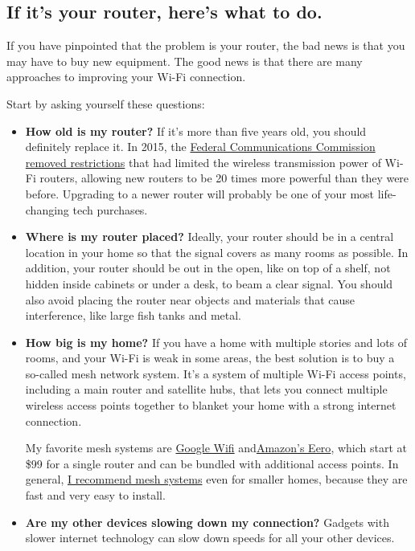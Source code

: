 \hypertarget{if-its-your-router-heres-what-to-do}{%
\subsection{If it's your router, here's what to
do.}\label{if-its-your-router-heres-what-to-do}}

If you have pinpointed that the problem is your router, the bad news is
that you may have to buy new equipment. The good news is that there are
many approaches to improving your Wi-Fi connection.

Start by asking yourself these questions:

\begin{itemize}
\item
  \textbf{How old is my router?} If it's more than five years old, you
  should definitely replace it. In 2015, the
  \href{https://www.fcc.gov/document/5-ghz-u-nii-ro}{Federal
  Communications Commission removed restrictions} that had limited the
  wireless transmission power of Wi-Fi routers, allowing new routers to
  be 20 times more powerful than they were before. Upgrading to a newer
  router will probably be one of your most life-changing tech purchases.
\item
  \textbf{Where is my router placed?} Ideally, your router should be in
  a central location in your home so that the signal covers as many
  rooms as possible. In addition, your router should be out in the open,
  like on top of a shelf, not hidden inside cabinets or under a desk, to
  beam a clear signal. You should also avoid placing the router near
  objects and materials that cause interference, like large fish tanks
  and metal.
\item
  \textbf{How big is my home?} If you have a home with multiple stories
  and lots of rooms, and your Wi-Fi is weak in some areas, the best
  solution is to buy a so-called mesh network system. It's a system of
  multiple Wi-Fi access points, including a main router and satellite
  hubs, that lets you connect multiple wireless access points together
  to blanket your home with a strong internet connection.

  My favorite mesh systems are
  \href{https://store.google.com/us/config/nest_wifi}{Google Wifi}
  and\href{https://www.amazon.com/Introducing-eero-mesh-WiFi-system-3-pack-/dp/B07WMLPSRL}{Amazon's
  Eero}, which start at \$99 for a single router and can be bundled with
  additional access points. In general,
  \href{https://www.nytimes3xbfgragh.onion/2017/04/26/technology/personaltech/mesh-network-vs-router.html}{I
  recommend mesh systems} even for smaller homes, because they are fast
  and very easy to install.
\item
  \textbf{Are my other devices slowing down my connection?} Gadgets with
  slower internet technology can slow down speeds for all your other
  devices.


\end{itemize}
